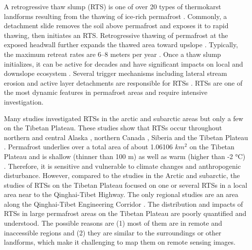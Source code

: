 \documentclass[preprint,12pt,authoryear]{elsarticle}
\begin{document}
A retrogressive thaw slump (RTS) is one of over 20 types of thermokarst landforms resulting from the thawing of ice-rich permafrost \citep{czudek_thermokarst_1970, jorgenson_response_2005, jorgenson_thermokarst_2013,kokelj2013advances}. Commonly, a detachment slide removes the soil above permafrost and exposes it to rapid thawing, then initiates an RTS. Retrogressive thawing of permafrost at the exposed headwall further expands the thawed area toward upslope \citep{jorgenson_thermokarst_2013}. Typically, the maximum retreat rates are 6--8 meters per year \citep{jorgenson_thermokarst_2013}. Once a thaw slump initializes, it can be active for decades \citep{burn1989geomorphology, lacelle2010climatic, swanson2018growth} and have significant impacts on local and downslope ecosystem \citep{gooseff2009effects, pierre2018unprecedented, zolkos2018mineral}. Several trigger mechanisms including lateral stream erosion and active layer detachments are responsible for RTSs \citep{french2017periglacial}.  RTSs are one of the most dynamic features in permafrost areas and require intensive investigation. %

Many studies investigated RTSs in the arctic and subarctic areas but only a few on the Tibetan Plateau. These studies show that RTSs occur throughout northern and central Alaska \citep{swanson2018growth,gooseff2009effects,balser2014timing}, northern Canada \citep{burn1989geomorphology, lacelle2010climatic, ramage_terrain_2017, lantuit_fifty_2008, lacelle_distribution_2015, segal2016acceleration, brooker2014investigating, kokelj2017climate, obu2017coastal, ramage_increasing_2018, lantz2008increasing, brooker2014mapping, frappier2017retrogressive, zwieback2018sub, rudy2017terrain, armstrong2018thaw, kokelj2013thawing, rudy2016transferability, burn1990canadian,  cassidy2017impacts}, Siberia \citep{czudek_thermokarst_1970, zwieback2018sub, leibman2003dynamics} and the Tibetan Plateau \citep{wang1995situ, niu2005engineering, niu2012development, niu2014thaw, niu2016thaw, sun2017creep, ma2006slope}. Permafrost underlies over a total area of about 1.06106 $km^2$ on the Tibetan Plateau \citep{zou2017new} and is shallow (thinner than 100 m) as well as warm (higher than -2 °C) \citep{zhou_geocryology_2000}. Therefore, it is sensitive and vulnerable to climate changes and anthropogenic disturbance. However, compared to the studies in the Arctic and subarctic, the studies of RTSs on the Tibetan Plateau focused on one or several RTSs in a local area near to the Qinghai-Tibet Highway. The only regional studies are an area along the Qinghai-Tibet Engineering Corridor \citep{niu2014thaw, niu2016thaw}. The distribution and impacts of RTSs in large permafrost areas on the Tibetan Plateau are poorly quantified and understood. The possible reasons are (1) most of them are in remote and inaccessible regions and (2) they are similar to the surroundings or other landforms, which make it challenging to map them on remote sensing images.  %
\end{document}
